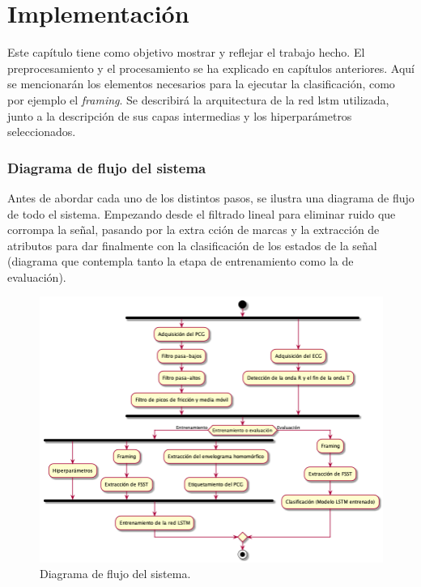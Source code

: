 \usepackage{amsfonts}

\chapter{Implementación} \label{ch:results}

\indent Este capítulo tiene como objetivo mostrar y reflejar el trabajo hecho. El preprocesamiento y el
procesamiento se ha explicado en capítulos anteriores. Aquí se mencionarán los elementos necesarios para la ejecutar
la clasificación, como por ejemplo el \textit{framing}. Se describirá la arquitectura de la red \acrshort{lstm}
utilizada, junto a la descripción de sus capas intermedias y los hiperparámetros seleccionados. \bigskip

\subsection*{Diagrama de flujo del sistema} \label{subsec:flow-diagram}

\indent Antes de abordar cada uno de los distintos pasos, se ilustra una diagrama de flujo de todo el sistema.
Empezando desde el filtrado lineal para eliminar ruido que corrompa la señal, pasando por la extra cción de marcas y
la extracción de atributos para dar finalmente con la clasificación de los estados de la señal (diagrama que
contempla tanto la etapa de entrenamiento como la de evaluación).


\begin{figure}[H]
  \centering
  \includegraphics[scale=0.5]{chapters/chapter-07/images/flow-diagram.png}
  \caption[Diagrama de flujo del sistema]{Diagrama de flujo del sistema.}
  \label{fig:flow-diagram}
\end{figure}

